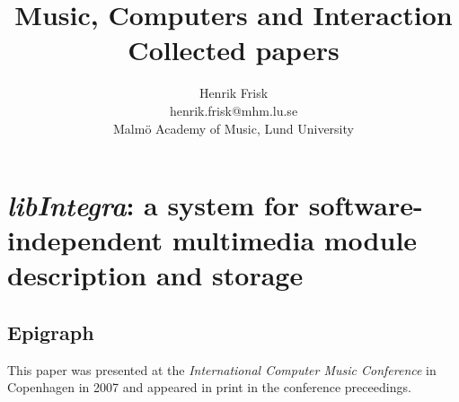 \documentclass[a4paper]{article}
\title{Music, Computers and Interaction\\Collected papers}
\author{Henrik Frisk\\henrik.frisk@mhm.lu.se\\Malmö Academy of Music,
  Lund University}
\numberwithin{equation}{section}
\begin{document}

 \chapter{\emph{libIntegra}: a system for software-independent multimedia module description and storage}
  \label{cha:libint-syst-softw}

  \section{Epigraph}
  \label{sec:epigraph}

  This paper was presented at the \emph{International Computer Music Conference} in Copenhagen in 2007 and appeared in print in the conference preceedings. \citep{frisk-bull07}
  
  
  

\chapter*{\bibname}



\end{document}
